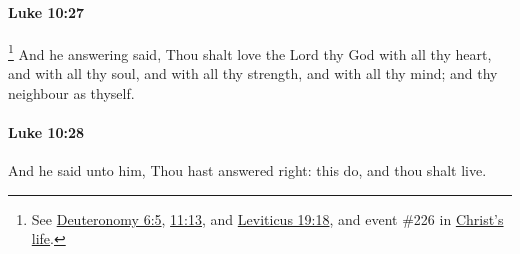 		\paragraph{Luke 10:27} %
			\label{LUKE-10-27}

				\footnote{%
					See \hyperref[DEUTERONOMY-6-5]{Deuteronomy 6:5}, \hyperref[DEUTERONOMY-11-13]{11:13}, and \hyperref[LEVITICUS-19-18]{Leviticus 19:18}, and event \#226 in \hyperref[LCHRIST]{Christ's life}.
					}%
			And he answering said, Thou shalt love the Lord thy God with all thy heart, and with all thy soul, and with all thy strength, and with all thy mind; and thy neighbour as thyself.

			\begin{framed}
			\scriptsize
				\begin{compactdesc}
					\item[SBLG] 
				\end{compactdesc}
			\end{framed}

		\paragraph{Luke 10:28} %
			\label{LUKE-10-28}

			And he said unto him, Thou hast answered right: this do, and thou shalt live.

